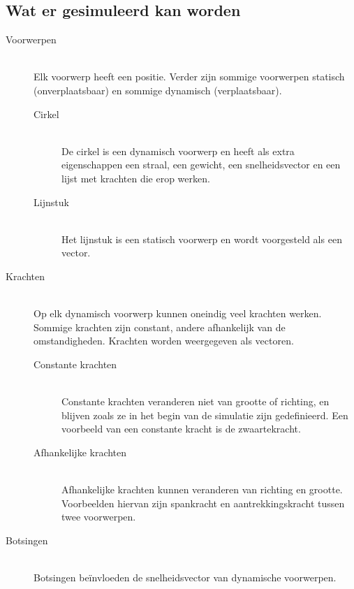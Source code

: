 \documentclass[12pt,a4paper]{article}
\begin{document}
	\subsection{Wat er gesimuleerd kan worden}
	\begin{description}
  		\item[Voorwerpen] \hfill \\
  			Elk voorwerp heeft een positie. Verder zijn sommige voorwerpen statisch (onverplaatsbaar) en sommige dynamisch (verplaatsbaar).
			\begin{description}
				\item[Cirkel] \hfill \\
					De cirkel is een dynamisch voorwerp en heeft als extra eigenschappen een straal, een gewicht, een snelheidsvector en een lijst met krachten die erop werken.
				
				\item[Lijnstuk] \hfill \\
					Het lijnstuk is een statisch voorwerp en wordt voorgesteld als een vector.
			\end{description}
		\item[Krachten] \hfill \\
			Op elk dynamisch voorwerp kunnen oneindig veel krachten werken. Sommige krachten zijn constant, andere afhankelijk van de omstandigheden. Krachten worden weergegeven als vectoren.
			\begin{description}
				\item[Constante krachten] \hfill \\
					Constante krachten veranderen niet van grootte of richting, en blijven zoals ze in het begin van de simulatie zijn gedefinieerd. Een voorbeeld van een constante kracht is de zwaartekracht.
				\item[Afhankelijke krachten] \hfill \\
					Afhankelijke krachten kunnen veranderen van richting en grootte. Voorbeelden hiervan zijn spankracht en aantrekkingskracht tussen twee voorwerpen.
			\end{description}
		\item[Botsingen] \hfill \\
			Botsingen be\"{i}nvloeden de snelheidsvector van dynamische voorwerpen.
	\end{description}
	
\end{document}
